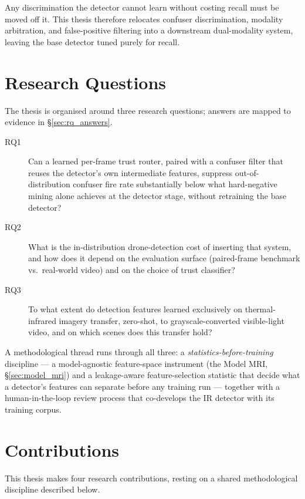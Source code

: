 Any discrimination the detector cannot learn without costing recall must be moved off it. This thesis therefore relocates confuser discrimination, modality arbitration, and false-positive filtering into a downstream dual-modality system, leaving the base detector tuned purely for recall.

\section{Research Questions}
\label{sec:rqs}

The thesis is organised around three research questions; answers are mapped to evidence in \S\ref{sec:rq_answers}.

\begin{description}
    \item[RQ1] Can a learned per-frame trust router, paired with a confuser filter that reuses the detector's own intermediate features, suppress out-of-distribution confuser fire rate substantially below what hard-negative mining alone achieves at the detector stage, without retraining the base detector?
    \item[RQ2] What is the in-distribution drone-detection cost of inserting that system, and how does it depend on the evaluation surface (paired-frame benchmark vs.\ real-world video) and on the choice of trust classifier?
    \item[RQ3] To what extent do detection features learned exclusively on thermal-infrared imagery transfer, zero-shot, to grayscale-converted visible-light video, and on which scenes does this transfer hold?
\end{description}

A methodological thread runs through all three: a \emph{statistics-before-training} discipline --- a model-agnostic feature-space instrument (the Model MRI, \S\ref{sec:model_mri}) and a leakage-aware feature-selection statistic that decide what a detector's features can separate before any training run --- together with a human-in-the-loop review process that co-develops the IR detector with its training corpus.

\section{Contributions}

This thesis makes four research contributions, resting on a shared methodological discipline described below.

